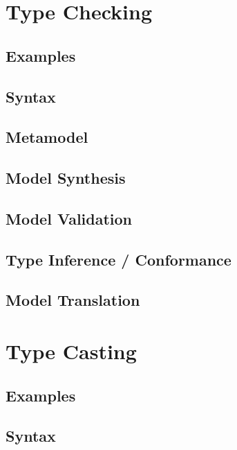 \documentclass[a4paper,oneside,12pt, extrafontsizes]{memoir}
\begin{document}
  \chapter{Type Checking}
  \label{ch:type-checking}
  

    \section{Examples}
    

    \section{Syntax}
    

    \section{Metamodel}

    \section{Model Synthesis}

    \section{Model Validation}

    \section{Type Inference / Conformance}

    \section{Model Translation}

  \chapter{Type Casting}
  \label{ch:type-casting}
  

    \section{Examples}
    

    \section{Syntax}
    
\end{document}
